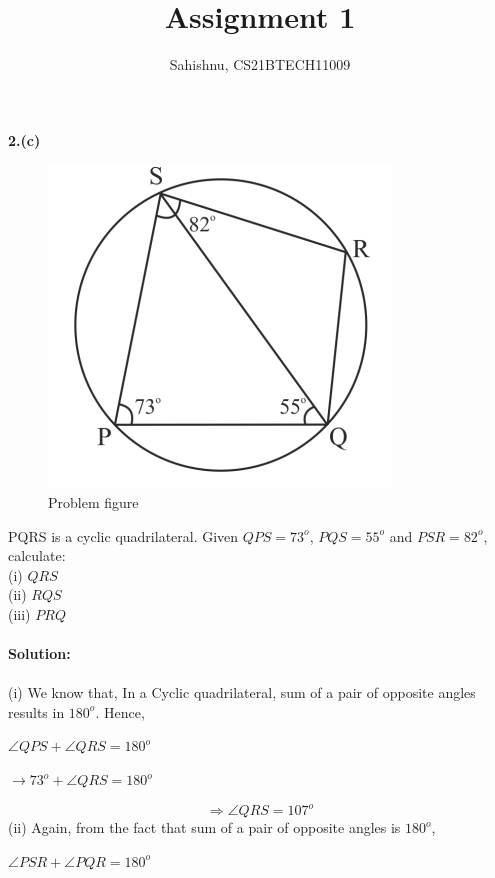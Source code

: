 \documentclass[8pt, twocolumn]{article}
\title{Assignment 1}
\author{Sahishnu, CS21BTECH11009}
\date{}
\begin{document}
\maketitle
\textbf {2.(c)}\\
\begin{center}
\begin{figure}[ht]
    \centering
    \includegraphics[scale=0.5]{figs/fig1.png}
    \caption{Problem figure}
    \label{fig:my_label}
\end{figure}

\end{center}
PQRS is a cyclic quadrilateral. Given \angle $QPS=73^o$, \angle $PQS=55^o$ and \angle $PSR=82^o$, calculate:\\
(i) \angle $QRS$\\
(ii) \angle $RQS$\\
(iii) \angle $PRQ$\\\\
\textbf {Solution: }\\\\
(i) We know that, In a Cyclic quadrilateral, sum of a pair of opposite angles results in $180^o$.
Hence,
\begin{center}
   $\angle QPS + \angle QRS = 180^o$
\end{center}
\begin{center}
$\rightarrow 73^o + \angle QRS = 180^o$
\end{center}
\begin{equation}
    \Rightarrow \angle QRS = 107^o
\end{equation}
(ii) Again, from the fact that sum of a pair of opposite angles is $180^o$,
\begin{center}
    $\angle PSR + \angle PQR = 180^o$
\end{center}
\end{document}
